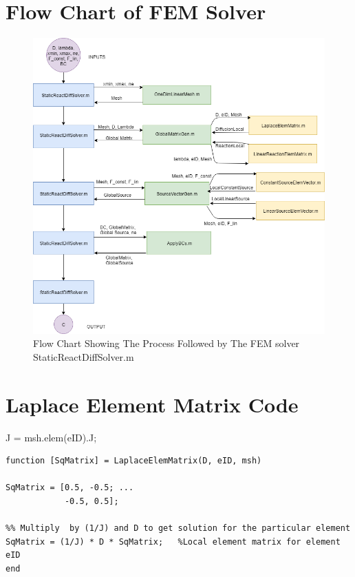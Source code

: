 \documentclass[11pt]{article}
\begin{document}
\begin{appendices}

\section{Flow Chart of FEM Solver}

\begin{figure}[ht]  %
	\centering
	\includegraphics[width=1\textwidth]{FLOW.png}
    \caption{Flow Chart Showing The Process Followed by The FEM solver StaticReactDiffSolver.m}\label{fig:flowchart}
\end{figure}
\clearpage
\section{Laplace Element Matrix Code}\label{ap:LaplaceElem}


J = msh.elem(eID).J;  %
\begin{lstlisting}
function [SqMatrix] = LaplaceElemMatrix(D, eID, msh)

SqMatrix = [0.5, -0.5; ...
            -0.5, 0.5];

%% Multiply  by (1/J) and D to get solution for the particular element
SqMatrix = (1/J) * D * SqMatrix;   %Local element matrix for element eID
end
\end{lstlisting}
\pagebreak






\end{appendices}
\end{document}
